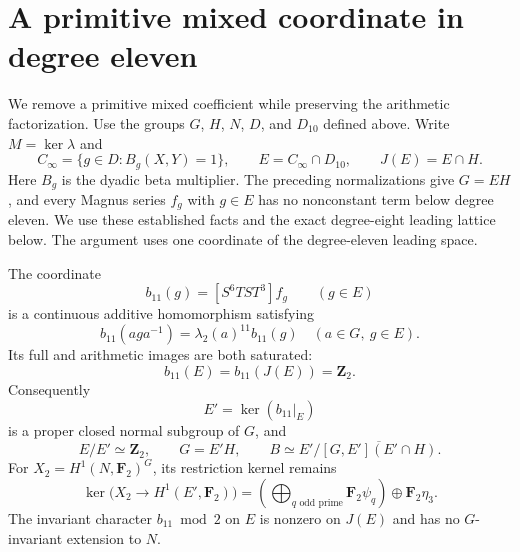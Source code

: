 \section{A primitive mixed coordinate in degree eleven}
\label{sec:eleven-mixed-mixed}

We remove a primitive mixed coefficient while preserving the arithmetic
factorization. Use the groups $G$, $H$, $N$, $D$, and $D_{10}$ defined above.
Write $M=\ker\lambda$ and
\[
 C_\infty=\{g\in D:B_g(X,Y)=1\},\qquad
 E=C_\infty\cap D_{10},\qquad J(E)=E\cap H.
\]
Here $B_g$ is the dyadic beta multiplier. The preceding normalizations
give $G=EH$, and every Magnus series $f_g$ with $g\in E$ has no
nonconstant term below degree eleven. We use these established facts
and the exact degree-eight leading lattice below. The argument uses one coordinate of the degree-eleven leading space.

\begin{theorem}\label{thm:eleven-mixed-mixed-reduction}
The coordinate
\[
 b_{11}(g)=[S^6TST^3]f_g\qquad(g\in E)
\]
is a continuous additive homomorphism satisfying
\[
 b_{11}(aga^{-1})=\lambda_2(a)^{11}b_{11}(g)
 \quad(a\in G,\ g\in E).
\]
Its full and arithmetic images are both saturated:
\[
 b_{11}(E)=b_{11}(J(E))=\mathbf Z_2.
\]
Consequently
\[
 E'=\ker(b_{11}|_E)
\]
is a proper closed normal subgroup of $G$, and
\[
 E/E'\simeq\mathbf Z_2,\qquad G=E'H,
 \qquad
 B\simeq E'/\overline{[G,E'](E'\cap H)}.
\]
For $X_2=H^1(N,\mathbf F_2)^G$, its restriction kernel remains
\[
 \ker\bigl(X_2\longrightarrow H^1(E',\mathbf F_2)\bigr)
 =\left(\bigoplus_{q\text{ odd prime}}\mathbf F_2\psi_q\right)
       \oplus\mathbf F_2\eta_3.
\]
The invariant character $b_{11}\bmod2$ on $E$ is nonzero on $J(E)$
and has no $G$-invariant extension to $N$.
\end{theorem}


